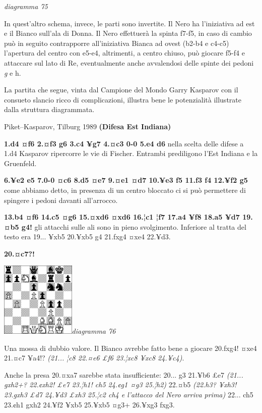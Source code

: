 \documentclass[
]{article}
\begin{document}
\emph{diagramma 75}

In quest'altro schema, invece, le parti sono invertite. Il Nero ha
l'iniziativa ad est e il Bianco sull'ala di Donna. Il Nero effettuerà la
spinta f7-f5, in caso di cambio può in seguito contrapporre
all'iniziativa Bianca ad ovest (b2-b4 e c4-c5) l'apertura del centro con
e5-e4, altrimenti, a centro chiuso, può giocare f5-f4 e attaccare sul
lato di Re, eventualmente anche avvalendosi delle spinte dei pedoni
\emph{g} e h.

La partita che segue, vinta dal Campione del Mondo Garry Kasparov con il
consueto slancio ricco di complicazioni, illustra bene le potenzialità
illustrate dalla struttura diagrammata.

Piket--Kasparov, Tilburg 1989 \textbf{(Difesa Est Indiana)}

\textbf{1.d4 ¤f6 2.¤f3 g6 3.c4 ¥g7 4.¤c3 0-0 5.e4 d6} nella scelta delle
difese a 1.d4 Kasparov ripercorre le vie di Fischer. Entrambi
prediligono l'Est Indiana e la Gruenfeld.

\textbf{6.¥e2 e5 7.0-0 ¤c6 8.d5 ¤e7 9.¤e1 ¤d7 10.¥e3 f5 11.f3 f4 12.¥f2
g5} come abbiamo detto, in presenza di un centro bloccato ci si può
permettere di spingere i pedoni davanti all'arrocco.

\textbf{13.b4 ¤f6 14.c5 ¤g6 15.¤xd6 ¤xd6 16.¦c1 ¦f7 17.a4 ¥f8 18.a5 ¥d7
19.¤b5 g4!} gli attacchi sulle ali sono in pieno svolgimento. Inferiore
al tratta del testo era 19... ¥xb5 20.¥xb5 g4 21.fxg4 ¤xe4 22.¥d3.

\textbf{20.¤c7?!}

\includegraphics[width=1.40139in,height=1.40139in]{vertopal_109f12be458a423d8f3cc838880eaea2/media/image76.png}\emph{diagramma
76}

Una mossa di dubbio valore. Il Bianco avrebbe fatto bene a giocare
20.fxg4! ¤xe4 21.¤c7 ¥a4!? \emph{(21... ¦c8 22.¤e6 £f6 23.¦xc8 ¥xc8
24.¥c4)}.

Anche la presa 20.¤xa7 sarebbe stata insufficiente: 20... g3 21.¥b6 £e7
\emph{(21... gxh2+? 22.¢xh2! £e7 23.¦h1! ch5 24.¢g1 ¤g3 25.¦h2)} 22.¤b5
\emph{(22.h3? ¥xh3! 23.gxh3 £d7 24.¥d3 £xh3 25.¦c2 ch4 e l'attacco del
Nero arriva prima)} 22... ch5 23.¢h1 gxh2 24.¥f2 ¥xb5 25.¥xb5 ¤g3+
26.¥xg3 fxg3.
\end{document}
